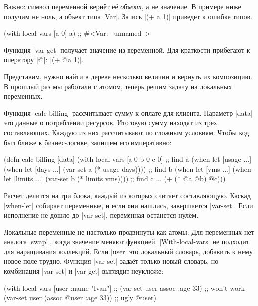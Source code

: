 Важно: символ переменной верн\"{е}т е\"{е} \emph{объект}, а не значение. В примере ниже
получим не ноль, а объект типа \spverb|Var|. Запись \spverb|(+ a 1)| приведет к
ошибке типов.

\begin{english}
  \begin{clojure}
(with-local-vars [a 0] a)
;; #<Var: --unnamed-->
  \end{clojure}
\end{english}

Функция \spverb|var-get| получает значение из переменной. Для краткости
прибегают к оператору \spverb|@|: \spverb|(+ @a 1)|.

Представим, нужно найти в дереве несколько величин и вернуть их композицию. В
прошлый раз мы работали с атомом, теперь решим задачу на локальных переменных.

Функция \spverb|calc-billing| рассчитывает сумму к оплате для клиента. Параметр
\spverb|data| это данные о потреблении ресурсов. Итоговую сумму находят из трех
составляющих. Каждую из них рассчитывают по сложным условиям. Чтобы код был
ближе к бизнес-логике, запишем его императивно:

\begin{english}
  \begin{clojure}
(defn calc-billing [data]
  (with-local-vars
    [a 0 b 0 c 0]
    ;; find a
    (when-let [usage ...]
      (when-let [days ...]
        (var-set a (* usage days))))
    ;; find b
    (when-let [vms ...]
      (when-let [limits ...]
        (var-set b (* limits vms))))
    ;; find c ...
    (+ (* @a @b) @c)))
  \end{clojure}
\end{english}

Расчет делится на три блока, каждый из которых считает составляющую. Каскад
\spverb|when-let| собирает переменные, и если они нашлись, завершается
\spverb|var-set|. Если исполнение не дошло до \spverb|var-set|, переменная
останется нул\"{е}м.

Локальные переменные не настолько продвинуты как атомы. Для переменных нет
аналога \spverb|swap!|, когда значение меняют функцией. \spverb|With-local-vars|
не подходит для наращивания коллекций. Если \spverb|user| это локальный словарь,
добавить к нему новое поле трудно. Функция \spverb|var-set| зада\"{е}т только
новый словарь, но комбинация \spverb|var-set| и \spverb|var-get| выглядит
неуклюже:

\begin{english}
  \begin{clojure}
(with-local-vars [user {:name "Ivan"}]
  ;; (var-set user assoc :age 33) ;; won't work
  (var-set user (assoc @user :age 33)) ;; ugly
  @user)
  \end{clojure}
\end{english}

